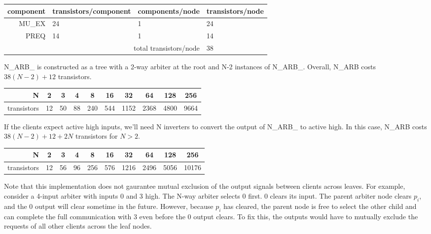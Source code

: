 \documentclass[aer.tex]{subfiles}
\begin{document}
\begin{center}
    \begin{tabular}{|r|l|l|l|}
    \hline
    component & transistors/component & components/node & transistors/node \\ \hline
    MU\_EX & 24 & 1 & 24 \\ \hline
    PREQ & 14& 1 & 14 \\ \hline
    \multicolumn{3}{|r|}{total transistors/node} & 38 \\ \hline
    \end{tabular}
\end{center}

N\_ARB\_ is constructed as a tree with a 2-way arbiter at the root and N-2 instances of N\_ARB\_. 
Overall, N\_ARB costs $38(N-2)+12$ transistors.

\begin{center}
  \begin{tabular}{|r|c|c|c|c|c|c|c|c|c|}
    \hline
    N & 2 & 3 & 4 & 8 & 16 & 32 & 64 & 128 & 256 \\
    \hline
    transistors & 12 & 50 & 88 & 240 & 544 & 1152 & 2368 & 4800 & 9664 \\
    \hline
  \end{tabular}
\end{center}

If the clients expect active high inputs, we'll need N inverters to convert the output of N\_ARB\_ to active high.
In this case, N\_ARB costs $38(N-2)+12+2N$ transistors for $N>2$.

\begin{center}
  \begin{tabular}{|r|c|c|c|c|c|c|c|c|c|}
    \hline
    N & 2 & 3 & 4 & 8 & 16 & 32 & 64 & 128 & 256 \\
    \hline
    transistors & 12 & 56 & 96 & 256 & 576 & 1216 & 2496 & 5056 & 10176 \\
    \hline
  \end{tabular}
\end{center}

Note that this implementation does not gaurantee mutual exclusion of the output signals between
clients across leaves. For example, consider a 4-input arbiter with inputs 0 and 3 high. The N-way arbiter selects 0 first. 0 clears its input. The parent arbiter node clears $p_i$, and the 0 output will clear sometime in the future. However, because $p_i$ has cleared, the parent node is free to select the other child and can complete the full communication with 3 even before the 0 output clears. To fix this, the outputs would have to mutually exclude the requests of all other clients across the leaf nodes.
\end{document}
